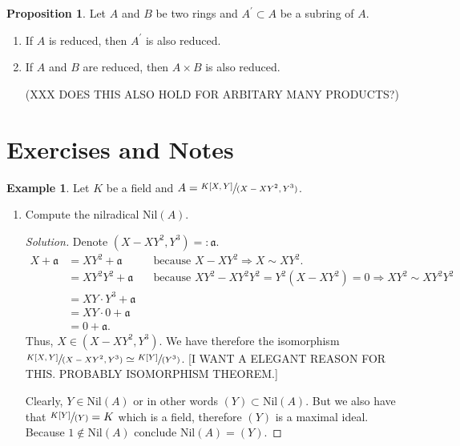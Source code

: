 \documentclass[a4paper]{book}
\theoremstyle{definition}
\newtheorem{example}{Example}[definition]
\newtheorem{proposition}[definition]{Proposition}
\begin{document}
\begin{thmbox}
    \begin{proposition}
        Let \(A\) and \(B\) be two rings and \(A^\prime \subset A\) be a subring of \(A\).
        \begin{enumerate}
            \item If \(A\) is reduced, then \(A^\prime\) is also reduced.
            \item If \(A\) and \(B\) are reduced, then \(A \times B\) is also reduced.
            
            (XXX DOES THIS ALSO HOLD FOR ARBITARY MANY PRODUCTS?)
        \end{enumerate}
    \end{proposition}
\end{thmbox}

\section{Exercises and Notes}

\begin{example}
    Let \(K\) be a field and \(A = \sfrac{K[X, Y]}{(X - XY^2, Y^3)}\).
    \begin{enumerate}
        \item Compute the nilradical \(\mathrm{Nil}(A)\).
        \begin{proof}[Solution]
            Denote \((X - XY^2, Y^3) =: \mathfrak{a}\).
            \begin{align*}
                X + \mathfrak{a} &= XY^2 + \mathfrak{a} && \text{because } X - XY^2 \Rightarrow X \sim XY^2 \text{.} \\
                &= XY^2 Y^2 + \mathfrak{a} && \text{because } XY^2 - XY^2Y^2 = Y^2 (X - XY^2) = 0 \Rightarrow XY^2 \sim XY^2Y^2 \\
                &= XY \cdot Y^3 + \mathfrak{a} \\
                &= XY \cdot 0 + \mathfrak{a} \\
                &= 0 + \mathfrak{a} \text{.}
            \end{align*}
            Thus, \(X \in (X - XY^2, Y^3)\). We have therefore the isomorphism \(\sfrac{K[X, Y]}{(X-XY^2, Y^3)} \simeq \sfrac{K[Y]}{(Y^3)}\). [I WANT A ELEGANT REASON FOR THIS. PROBABLY ISOMORPHISM THEOREM.]

            Clearly, \(Y \in \mathrm{Nil}(A)\) or in other words \((Y) \subset \mathrm{Nil}(A)\). But we also have that \(\sfrac{K[Y]}{(Y)} = K\) which is a field, therefore \((Y)\) is a maximal ideal. Because \(1 \not\in \mathrm{Nil}(A)\) conclude \(\mathrm{Nil}(A) = (Y)\).
        \end{proof}
    \end{enumerate}
\end{example}
\end{document}
